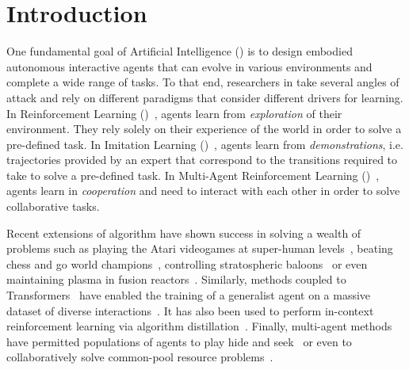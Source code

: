 
\chapter{Introduction}
\label{chap:intro}



One fundamental goal of Artificial Intelligence (\ai) is to design embodied autonomous interactive agents that can evolve in various environments and complete a wide range of tasks. To that end, researchers in \ai take several angles of attack and rely on different paradigms that consider different drivers for learning. In Reinforcement Learning (\rl)~\citep{sutton2018reinforcement}, agents learn from \textit{exploration} of their environment. They rely solely on their experience of the world in order to solve a pre-defined task. In Imitation Learning (\il)~\citep{pomerleau1991efficient}, agents learn from \textit{demonstrations}, i.e. trajectories provided by an expert that correspond to the transitions required to take to solve a pre-defined task.  In Multi-Agent Reinforcement Learning (\marl)~\citep{LITTMAN1994157}, agents learn in \textit{cooperation} and need to interact with each other in order to solve collaborative tasks.


Recent extensions of \rl algorithm have shown success in solving a wealth of problems such as playing the Atari videogames at super-human levels~\citep{mnih2015human}, beating chess and go world champions~\citep{silver2016mastering}, controlling stratospheric baloons~\citep{bellemare2020autonomous} or even maintaining plasma in fusion reactors~\citep{degrave2022magnetic}. Similarly, \il methods coupled to Transformers~\citep{vaswani2017attention} have enabled the training of a generalist agent on a massive dataset of diverse interactions~\citep{reed2022a}. It has also been used to perform in-context reinforcement learning via algorithm distillation~\citep{laskin2022incontext}. Finally, multi-agent methods have permitted populations of agents to play hide and seek~\citep{Baker2020Emergent} or even to collaboratively solve common-pool resource problems~\citep{perolat2017commonpool}.

